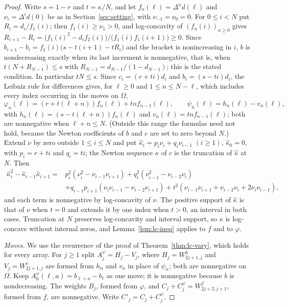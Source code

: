 \begin{proof}
Write $s=1-r$ and $t=\kappa/N$, and let $f_n(\ell)=\Delta^nd(\ell)$ and $\nu_i=\Delta^id(0)$ be as in Section~\ref{sec:setting}, with $\nu_{-1}=\nu_0=0$. For $0\leq i<N$ put $R_i=d_i/f_1(i)$; then $f_1(i)\geq\nu_1>0$, and log-concavity of $(f_n(i))_{n\geq0}$ gives $R_{i+1}-R_i=\bigl(f_1(i)^2-d_if_2(i)\bigr)/\bigl(f_1(i)f_1(i+1)\bigr)\geq0$. Since $b_{i+1}-b_i=f_1(i)\bigl(s-t(i+1)-tR_i\bigr)$ and the bracket is nonincreasing in $i$, $b$ is nondecreasing exactly when its last increment is nonnegative, that is, when $t(N+R_{N-1})\leq s$ with $R_{N-1}=d_{N-1}/(1-d_{N-1})$; this is the stated condition. In particular $tN\leq s$. Since $c_i=(r+ti)d_i$ and $b_i=(s-ti)d_i$, the Leibniz rule for differences gives, for $\ell\geq0$ and $1\leq n\leq N-\ell$, which includes every index occurring in the moves on $\Omega$,
\[
\varphi_n(\ell)=(r+t(\ell+n))f_n(\ell)+tnf_{n-1}(\ell),\qquad\psi_n(\ell)=h_n(\ell)-v_n(\ell),
\]
with $h_n(\ell)=(s-t(\ell+n))f_n(\ell)$ and $v_n(\ell)=tnf_{n-1}(\ell)$; both are nonnegative when $\ell+n\leq N$. (Outside this range the formulas need not hold, because the Newton coefficients of $b$ and $c$ are set to zero beyond $N$.) Extend $\nu$ by zero outside $1\leq i\leq N$ and put $\widehat\kappa_i=p_i\nu_i+q_i\nu_{i-1}$ $(i\geq1)$, $\widehat\kappa_0=0$, with $p_i=r+ti$ and $q_i=ti$; the Newton sequence $\kappa$ of $c$ is the truncation of $\widehat\kappa$ at $N$. Then
\[
\begin{aligned}
\widehat\kappa_i^2-\widehat\kappa_{i-1}\widehat\kappa_{i+1}={}&p_i^2(\nu_i^2-\nu_{i-1}\nu_{i+1})+q_i^2(\nu_{i-1}^2-\nu_{i-2}\nu_i)\\
&+q_{i-1}p_{i+1}(\nu_i\nu_{i-1}-\nu_{i-2}\nu_{i+1})+t^2(\nu_{i-1}\nu_{i+1}+\nu_{i-2}\nu_i+2\nu_i\nu_{i-1}),
\end{aligned}
\]
and each term is nonnegative by log-concavity of $\nu$. The positive support of $\widehat\kappa$ is that of $\nu$ when $t=0$ and extends it by one index when $t>0$, an interval in both cases. Truncation at $N$ preserves log-concavity and interval support, so $\kappa$ is log-concave without internal zeros, and Lemma~\ref{lem:lc-ineq} applies to $f$ and to $\varphi$.

\emph{Moves.} We use the recurrence of the proof of Theorem~\ref{thm:lc-vary}, which holds for every array. For $j\geq1$ split $A^\psi_j=H_j-V_j$, where $H_j=W^h_{2j+1,j}$ and $V_j=W^v_{2j+1,j}$ are formed from $h_n$ and $v_n$ in place of $\psi_n$; both are nonnegative on $\Omega$. Keep $A^\psi_0(\ell,a)=b_{\ell+a}-b_\ell$ as one move; it is nonnegative because $b$ is nondecreasing. The weights $B_j$, formed from $\varphi$, and $C_j+C^\psi_j=W^f_{2j+2,j+1}$, formed from $f$, are nonnegative. Write $C'_j=C_j+C^\psi_j$.


\end{proof}
